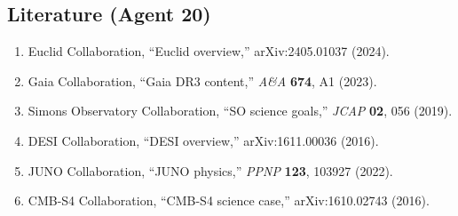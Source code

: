 \documentclass[11pt,a4paper]{article}
\begin{document}
\subsection{Literature (Agent 20)}

\begin{enumerate}
\item Euclid Collaboration, ``Euclid overview,'' arXiv:2405.01037 (2024).
\item Gaia Collaboration, ``Gaia DR3 content,'' \textit{A\&A} \textbf{674}, A1 (2023).
\item Simons Observatory Collaboration, ``SO science goals,'' \textit{JCAP} \textbf{02}, 056 (2019).
\item DESI Collaboration, ``DESI overview,'' arXiv:1611.00036 (2016).
\item JUNO Collaboration, ``JUNO physics,'' \textit{PPNP} \textbf{123}, 103927 (2022).
\item CMB-S4 Collaboration, ``CMB-S4 science case,'' arXiv:1610.02743 (2016).
\end{enumerate}
\end{document}

